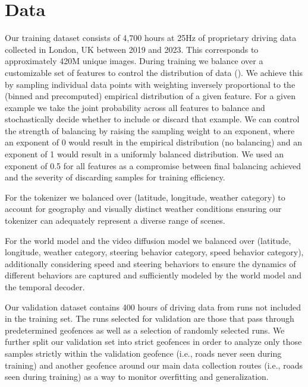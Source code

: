 \section{Data}
\label{section:data}

Our training dataset consists of 4,700 hours at 25Hz of proprietary driving data collected in London, UK between 2019 and 2023. This corresponds to approximately 420M unique images. During training we balance over a customizable set of features to control the distribution of data (). We achieve this by sampling individual data points with weighting inversely proportional to the (binned and precomputed) empirical distribution of a given feature. For a given example we take the joint probability across all features to balance and stochastically decide whether to include or discard that example. We can control the strength of balancing by raising the sampling weight to an exponent, where an exponent of 0 would result in the empirical distribution (no balancing) and an exponent of 1 would result in a uniformly balanced distribution. We used an exponent of 0.5 for all features as a compromise between final balancing achieved and the severity of discarding samples for training efficiency.

For the tokenizer we balanced over (latitude, longitude, weather category) to account for geography and visually distinct weather conditions ensuring our tokenizer can adequately represent a diverse range of scenes.

For the world model and the video diffusion model we balanced over (latitude, longitude, weather category, steering behavior category, speed behavior category), additionally considering speed and steering behaviors to ensure the dynamics of different behaviors are captured and sufficiently modeled by the world model and the temporal decoder.

Our validation dataset contains 400 hours of driving data from runs not included in the training set. The runs selected for validation are those that pass through predetermined geofences as well as a selection of randomly selected runs. We further split our validation set into strict geofences in order to analyze only those samples strictly within the validation geofence (i.e., roads never seen during training) and another geofence around our main data collection routes (i.e., roads seen during training) as a way to monitor overfitting and generalization.

